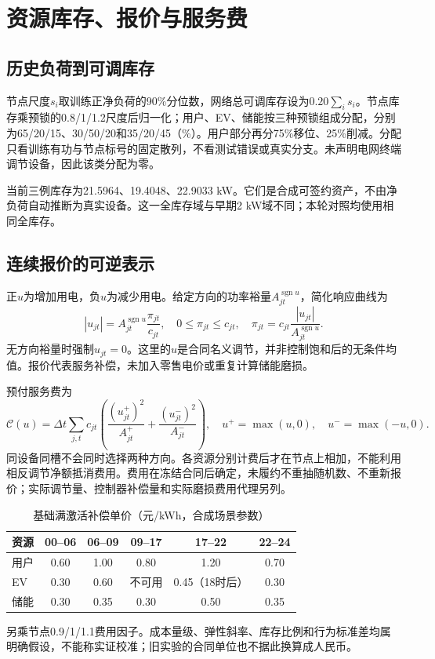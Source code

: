 \documentclass[UTF8,a4paper,11pt]{ctexart}
\begin{document}
\section{资源库存、报价与服务费}
\subsection{历史负荷到可调库存}
节点尺度$s_i$取训练正净负荷的90\%分位数，网络总可调库存设为$0.20\sum_i s_i$。节点库存乘预锁的0.8/1/1.2尺度后归一化；用户、EV、储能按三种预锁组成分配，分别为65/20/15、30/50/20和35/20/45（\%）。用户部分再分75\%移位、25\%削减。分配只看训练有功与节点标号的固定散列，不看测试错误或真实分支。未声明电网终端调节设备，因此该类分配为零。

当前三例库存为21.5964、19.4048、22.9033 kW。它们是合成可签约资产，不由净负荷自动推断为真实设备。这一全库存域与早期2 kW域不同；本轮对照均使用相同全库存。

\subsection{连续报价的可逆表示}
正$u$为增加用电，负$u$为减少用电。给定方向的功率裕量$A_{jt}^{\operatorname{sgn}u}$，简化响应曲线为
\begin{equation}
 |u_{jt}|=A_{jt}^{\operatorname{sgn}u}\frac{\pi_{jt}}{c_{jt}},\quad
 0\leq\pi_{jt}\leq c_{jt},\quad
 \pi_{jt}=c_{jt}\frac{|u_{jt}|}{A_{jt}^{\operatorname{sgn}u}}.
\end{equation}
无方向裕量时强制$u_{jt}=0$。这里的$u$是合同名义调节，并非控制饱和后的无条件均值。报价代表服务补偿，未加入零售电价或重复计算储能磨损。

预付服务费为
\begin{equation}
 \boxed{\mathcal C(u)=\Delta t\sum_{j,t}c_{jt}\left(\frac{(u_{jt}^{+})^2}{A_{jt}^{+}}+
 \frac{(u_{jt}^{-})^2}{A_{jt}^{-}}\right),\quad
 u^+=\max(u,0),\quad u^-=\max(-u,0).}\label{eq:cost}
\end{equation}
同设备同槽不会同时选择两种方向。各资源分别计费后才在节点上相加，不能利用相反调节净额抵消费用。费用在冻结合同后确定，未履约不重抽随机数、不重新报价；实际调节量、控制器补偿量和实际磨损费用代理另列。

\begin{table}[ht]\centering\small
\caption{基础满激活补偿单价（元/kWh，合成场景参数）}
\begin{tabular}{lccccc}\toprule
资源&00--06&06--09&09--17&17--22&22--24\\\midrule
用户&0.60&1.00&0.80&1.20&0.70\\
EV&0.30&0.60&不可用&0.45（18时后）&0.30\\
储能&0.30&0.35&0.30&0.50&0.35\\\bottomrule
\end{tabular}\end{table}
另乘节点0.9/1/1.1费用因子。成本量级、弹性斜率、库存比例和行为标准差均属明确假设，不能称实证校准；旧实验的合同单位也不据此换算成人民币。
\end{document}
